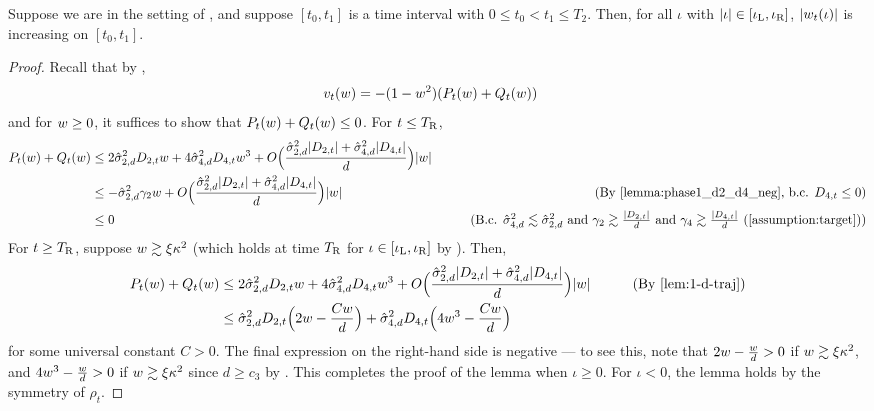 \begin{lemma} \label{lemma:w_increasing_phase2}
Suppose we are in the setting of , and suppose $[t_0, t_1]$ is a time interval with $0 \leq t_0 < t_1 \leq T_2$. Then, for all $\iota$ with $|\iota| \in [\iota_{\textup{L}}, \iota_{\textup{R}}]$, $|w_t(\iota)|$ is increasing on $[t_0, t_1]$.
\end{lemma}
\begin{proof}
Recall that by ,
\begin{align}
v_t(w)
& = -(1 - w^2) (P_t(w) + Q_t(w))
\end{align}
and for $w \geq 0$, it suffices to show that $P_t(w) + Q_t(w) \leq 0$. For $t \leq {T_{\textup{R}}}$,
\begin{align}
P_t(\w) + Q_t(\w)
& \leq 2 \sigmaCoeffTwo^2 D_{2, t} \w + 4 \sigmaCoeffFour^2 D_{4, t} \w^3 + O\Big(\frac{\sigmaCoeffTwo^2|D_{2, t}| + \sigmaCoeffFour^2 |D_{4, t}|}{d}\Big) |\w| \\
& \leq - \sigmaCoeffTwo^2 \gamma_2 \w + O\Big(\frac{\sigmaCoeffTwo^2 |D_{2, t}| + \sigmaCoeffFour^2 |D_{4, t}|}{d}\Big) |\w|
& \tag{By \Cref{lemma:phase1_d2_d4_neg}, b.c. $D_{4, t} \leq 0$} \\
& \leq 0
& \tag{B.c. $\sigmaCoeffFour^2 \lesssim \sigmaCoeffTwo^2$ and $\gamma_2 \gtrsim \frac{|D_{2, t}|}{d}$ and $\gamma_4 \gtrsim \frac{|D_{4, t}|}{d}$ (\Cref{assumption:target})}
\end{align}
For $t \geq {T_{\textup{R}}}$, suppose $w \gtrsim \xi \kappa^2$ (which holds at time ${T_{\textup{R}}}$ for $\iota \in [\iota_{\textup{L}}, \iota_{\textup{R}}]$ by ). Then,
\begin{align}
P_t(\w) + Q_t(\w)
& \leq 2 \sigmaCoeffTwo^2 D_{2, t} \w + 4  \sigmaCoeffFour^2 D_{4, t} \w^3 + O\Big(\frac{\sigmaCoeffTwo^2 |D_{2, t}| + \sigmaCoeffFour^2 |D_{4, t}|}{d}\Big) |\w|
& \tag{By \Cref{lem:1-d-traj}} \\
& \leq \sigmaCoeffTwo^2 D_{2, t} \Big(2\w - \frac{C\w}{d}\Big) + \sigmaCoeffFour^2 D_{4, t} \Big(4\w^3 - \frac{C\w}{d}\Big)
\end{align}
for some universal constant $C > 0$. The final expression on the right-hand side is negative --- to see this, note that $2w - \frac{w}{d} > 0$ if $w \gtrsim \xi \kappa^2$, and $4 w^3 - \frac{w}{d} > 0$ if $w \gtrsim \xi \kappa^2$ since $d \geq c_3$ by . This completes the proof of the lemma when $\iota \geq 0$. For $\iota < 0$, the lemma holds by the symmetry of $\rho_t$.
\end{proof}

